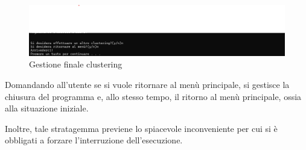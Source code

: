 \begin{figure}[h]
    \centering
    \includegraphics[width = .7\textwidth]{images/richeista continuazione.png}
    \caption{Gestione finale clustering}
\end{figure}

Domandando all'utente se si vuole ritornare al menù principale, si gestisce la chiusura del programma e, allo stesso tempo, il ritorno al menù principale, ossia alla situazione iniziale. 

Inoltre, tale stratagemma previene lo spiacevole inconveniente per cui si è obbligati a forzare l'interruzione dell'esecuzione.


